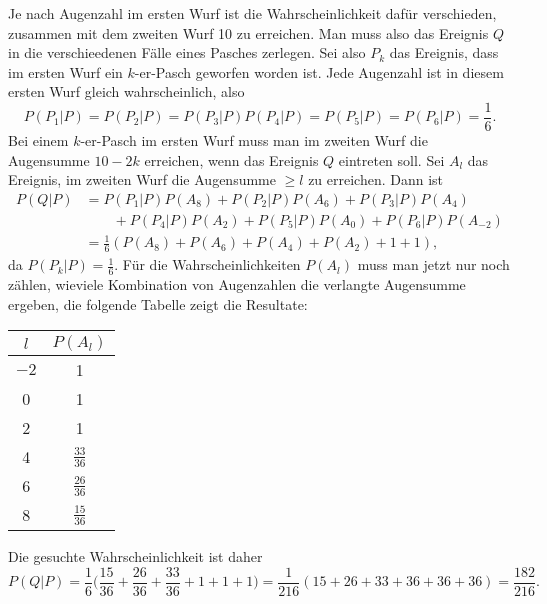 \begin{loesung}
\begin{teilaufgaben}
Je nach Augenzahl im ersten Wurf ist die Wahrscheinlichkeit
dafür verschieden, zusammen mit dem zweiten Wurf 10 zu erreichen.
Man muss also das Ereignis $Q$ in die verschieedenen Fälle eines
Pasches zerlegen. Sei also $P_k$ das Ereignis, dass im ersten Wurf
ein $k$-er-Pasch geworfen worden ist. Jede Augenzahl ist in diesem
ersten Wurf gleich wahrscheinlich, also
\[
P(P_1|P) = P(P_2|P) = P(P_3|P)
P(P_4|P) = P(P_5|P) = P(P_6|P)=\frac16.
\]
Bei einem $k$-er-Pasch im ersten Wurf muss man im zweiten Wurf die
Augensumme $10-2k$
erreichen, wenn das Ereignis $Q$ eintreten soll.
Sei $A_l$ das Ereignis, im zweiten Wurf die Augensumme $\ge l$
zu erreichen. Dann ist
\begin{align*}
P(Q|P)
&=P(P_1|P) P(A_8) + P(P_2|P) P(A_6) + P(P_3|P) P(A_4) \\
&\qquad + P(P_4|P)P(A_2) + P(P_5|P) P(A_0) + P(P_6|P) P(A_{-2})
\\
&=\frac1{6}(P(A_8) + P(A_6) + P(A_4) + P(A_2) + 1 + 1),
\end{align*}
da $P(P_k|P)=\frac1{6}$. Für die Wahrscheinlichkeiten $P(A_l)$ muss man
jetzt nur noch zählen, wieviele Kombination von Augenzahlen die
verlangte Augensumme ergeben, die folgende Tabelle zeigt die
Resultate:
\begin{center}
\begin{tabular}{|c|c|}
\hline
$l$&$P(A_l)$\\
\hline
$-2$&1\\
0&1\\
2&1\\
4&$\frac{33}{36}$
\\
6&$\frac{26}{36}$
\\
8&$\frac{15}{36}$
\\
\hline
\end{tabular}
\end{center}
Die gesuchte Wahrscheinlichkeit ist daher
\[
P(Q|P)
=
\frac1{6}\biggl(\frac{15}{36} + \frac{26}{36} + \frac{33}{36} + 1 + 1 + 1\biggr)
=
\frac1{216}(15 + 26 + 33 + 36 + 36 + 36)
=
\frac{182}{216}.
\]


\end{teilaufgaben}
\end{loesung}
